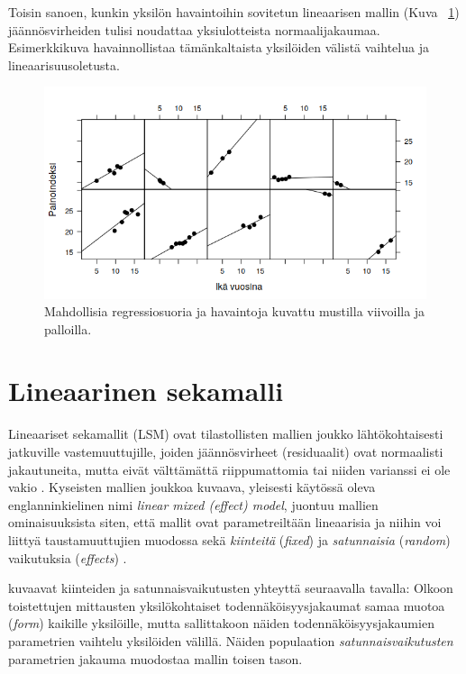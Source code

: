 \documentclass[finnish]{docopts}
\begin{document}
Toisin sanoen, kunkin yksilön havaintoihin sovitetun lineaarisen mallin (Kuva ~\ref{fig:xyplot}) jäännösvirheiden tulisi noudattaa yksiulotteista normaalijakaumaa. Esimerkkikuva havainnollistaa tämänkaltaista yksilöiden välistä vaihtelua ja lineaarisuusoletusta.\\

\begin{figure}[H]
\centering
  \includegraphics[scale=0.8]{kuvaajat/xyplot.png}
  \caption{Mahdollisia regressiosuoria ja havaintoja kuvattu mustilla viivoilla ja palloilla.}
  \label{fig:xyplot}
\end{figure}

\section{Lineaarinen sekamalli}
\label{sec:lsm}

Lineaariset sekamallit (LSM) ovat tilastollisten mallien joukko lähtökohtaisesti jatkuville vastemuuttujille, joiden jäännösvirheet (residuaalit) ovat normaalisti jakautuneita, mutta eivät välttämättä riippumattomia tai niiden varianssi ei ole vakio \cite{west14}. Kyseisten mallien joukkoa kuvaava, yleisesti käytössä oleva englanninkielinen nimi \textit{linear mixed (effect) model}, juontuu mallien ominaisuuksista siten, että mallit ovat parametreiltään lineaarisia ja niihin voi liittyä taustamuuttujien muodossa sekä \textit{kiinteitä} (\textit{fixed}) ja \textit{satunnaisia} (\textit{random}) vaikutuksia (\textit{effects}) \cite{west14}.

\cite{laird82} kuvaavat kiinteiden ja satunnaisvaikutusten yhteyttä seuraavalla tavalla: Olkoon toistettujen mittausten yksilökohtaiset todennäköisyysjakaumat samaa muotoa (\textit{form}) kaikille yksilöille, mutta sallittakoon näiden todennäköisyysjakaumien parametrien vaihtelu yksilöiden välillä. Näiden populaation \textit{satunnaisvaikutusten} parametrien jakauma muodostaa mallin toisen tason.
\end{document}
